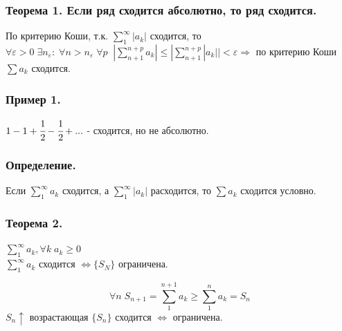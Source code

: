 \documentclass[12pt, paper]{article}
\newcommand{\eps}{\varepsilon}
\begin{document}
\subsubsection{\textbf{Теорема 1. Если ряд сходится абсолютно, то ряд сходится.}}
\begin{tcolorbox}[title=Доказательство (Критерий Коши)]
    По критерию Коши, т.к. $\sum^\infty_{1} |a_k|$ сходится, то $\forall \eps > 0\; \exists n_\eps:\; \forall n > n_\eps\; \forall p\;\; |\sum^{n+p}_{n+1} a_k| \leq |\sum^{n+p}_{n+1} |a_k|| < \eps \Rightarrow$ по критерию Коши $\sum a_k$ сходится.
\end{tcolorbox}
\subsubsection*{\textbf{Пример 1.}}
$1 - 1 + \cfrac{1}{2} - \cfrac{1}{2} + ... $ - сходится, но не абсолютно.
\subsubsection{\textbf{Определение.}} 
Если $\sum^{\infty}_{1} a_k$ сходится, а $\sum^{\infty}_{1} |a_k|$ расходится, то $\sum a_k$ сходится условно.
\subsubsection{\textbf{Теорема 2.}}
$\sum^{\infty}_{1} a_k, \forall k\; a_k \geq 0$\\
$\sum^{\infty}_{1} a_k$ сходится $\Leftrightarrow \{S_N\}$ ограничена.
\begin{tcolorbox}[title=Доказательство]
    \[\forall n\; S_{n+1} = \sum^{n+1}_{1} a_k \geq \sum^{n}_{1} a_k = S_n \]
    $S_n \uparrow$ возрастающая $\{S_n\}$ сходится $\Leftrightarrow$ ограничена.
\end{tcolorbox}
\end{document}
